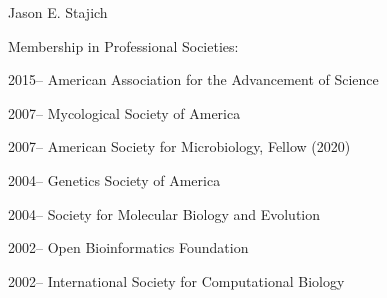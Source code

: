 \documentclass[10pt]{article}
\begin{document}
\begin{cv}{\centerline{Jason E. Stajich}}
\begin{cvlistcompact}{Membership in Professional Societies:}
\item [2015--] American Association for the Advancement of Science
\item [2007--] Mycological Society of America
\item [2007--] American Society for Microbiology, Fellow (2020)
\item [2004--] Genetics Society of America
\item [2004--] Society for Molecular Biology and Evolution
\item [2002--] Open Bioinformatics Foundation
\item [2002--] International Society for Computational Biology
\end{cvlistcompact}



\end{cv}
\end{document}
